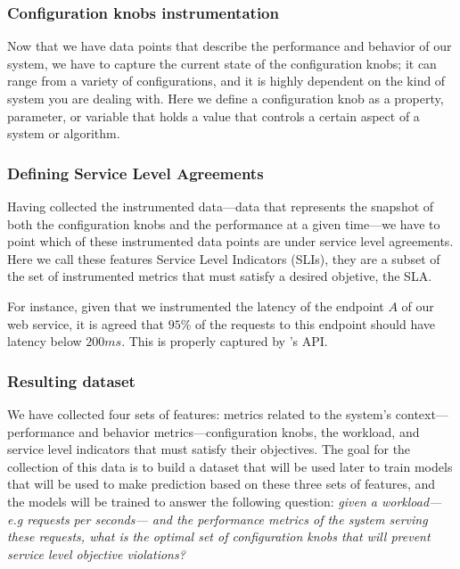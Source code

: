 \subsubsection{Configuration knobs instrumentation}

Now that we have data points that describe the performance and behavior of our system, we have to capture the current state of the configuration knobs; it can range from a variety of configurations, and it is highly dependent on the kind of system you are dealing with. Here we define a configuration knob as a property, parameter, or variable that holds a value that controls a certain aspect of a system or algorithm.

\subsubsection{Defining Service Level Agreements}

Having collected the instrumented data---data that represents the snapshot of both the configuration knobs and the performance at a given time---we have to point which of these instrumented data points are under service level agreements. Here we call these features Service Level Indicators (SLIs), they are a subset of the set of instrumented metrics that must satisfy a desired objetive, the SLA. 

For instance, given that we instrumented the latency of the endpoint $A$ of our web service, it is agreed that $95\%$ of the requests to this endpoint should have latency below $200ms$. This is properly captured by \projectname{}'s API.



\subsubsection{Resulting dataset}

We have collected four sets of features: metrics related to the system's context---performance and behavior metrics---configuration knobs, the workload, and service level indicators that must satisfy their objectives. The goal for the collection of this data is to build a dataset that will be used later to train models that will be used to make prediction based on these three sets of features, and the models will be trained to answer the following question: \textit{given a workload---e.g requests per seconds--- and the performance metrics of the system serving these requests, what is the optimal set of configuration knobs that will prevent service level objective violations?}

